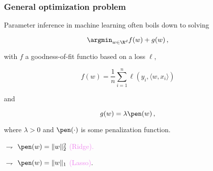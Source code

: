 \documentclass[xcolor={usenames,dvipsnames}]{beamer}
\begin{document}
\begin{frame}
	\frametitle{General optimization problem}
	
\alert{Parameter inference in machine learning} often boils down to solving

\begin{equation*}
\argmin_{w \in \R^d} f(w) + g(w)\,,
\end{equation*}

with $f$ a \alert{goodness-of-fit functio  based on a loss $\ell$},

\begin{equation*}
f(w) = \frac 1n \sum_{i=1}^n \ell(y_i, \langle w, x_i \rangle)
\end{equation*}

 and

\begin{equation*}
g(w) = \lambda \pen(w)\,,
\end{equation*}

where $\lambda>0$ and \alert{$\pen(\cdot)$ is some penalization function}.


$\rightharpoondown$ \textcolor{violet}{$\pen(w) =  \|w\|_2^2$ (Ridge).}

$\rightharpoondown$ \textcolor{violet}{$\pen(w) = \|w\|_1$ (Lasso)}.


\end{frame}




%
%
%
%
%
%
%
%
%
%
\end{document}
